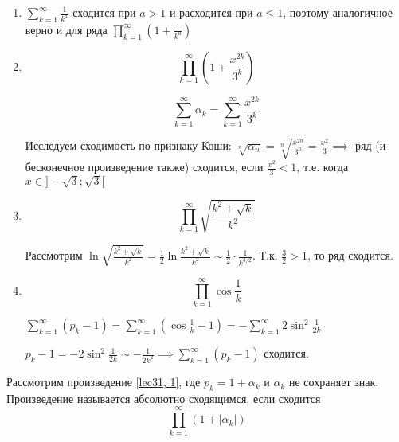 \documentclass[../../main.tex]{subfiles}
\begin{document}
	\begin{example}
		\begin{enumerate}
			\item $\sum\limits_{k = 1}^{\infty} \frac{1}{k^a}$ сходится при $a > 1$ и расходится при $a \leq 1$, поэтому аналогичное верно и для ряда $\prod\limits_{k = 1}^{\infty} \left(1 + \frac{1}{k^a}\right)$
			
			\item \[\prod\limits_{k = 1}^{\infty} \left(1 + \frac{x^{2k}}{3^k}\right)\]
			
			\[\sum\limits_{k = 1}^{\infty}\alpha_k = \sum\limits_{k = 1}^{\infty} \frac{x^{2k}}{3^k}\]
			
			Исследуем сходимость по признаку Коши: $\sqrt[n]{\alpha_n} = \sqrt[n]{\frac{x^{2n}}{3^n}} = \frac{x^2}{3} \implies$ ряд (и бесконечное произведение также) сходится, если $\frac{x^2}{3} < 1$, т.е. когда $x \in ]-\sqrt{3}; \sqrt{3}[$
			
			\item \[\prod\limits_{k = 1}^{\infty} \sqrt{\frac{k^2 + \sqrt{k}}{k^2}}\]
			
			Рассмотрим $\ln\sqrt{\frac{k^2 + \sqrt{k}}{k^2}} = \frac{1}{2}\ln\frac{k^2 + \sqrt{k}}{k^2} \sim \frac{1}{2} \cdot \frac{1}{k^{3/2}}$. Т.к. $\frac{3}{2} > 1$, то ряд сходится.
			
			\item \[\prod\limits_{k = 1}^{\infty} \cos\frac{1}{k}\]
			
			$\sum\limits_{k = 1}^{\infty}(p_k - 1) = \sum\limits_{k = 1}^{\infty} (\cos\frac{1}{k} - 1) = -\sum\limits_{k = 1}^{\infty}2\sin^2\frac{1}{2k}$
			
			$p_k - 1 = -2\sin^2\frac{1}{2k} \sim -\frac{1}{2k^2} \implies \sum\limits_{k = 1}^{\infty}(p_k - 1)$ сходится.
		\end{enumerate}	
	\end{example}

	Рассмотрим произведение \eqref{lec31, 1}, где $p_k = 1 + \alpha_k$ и $\alpha_k$ не сохраняет знак. Произведение называется абсолютно сходящимся, если сходится
	\begin{equation} \label{lec31, 6}
	 \prod\limits_{k = 1}^{\infty} (1 + |\alpha_k|)
	\end{equation}
	
\end{document}
